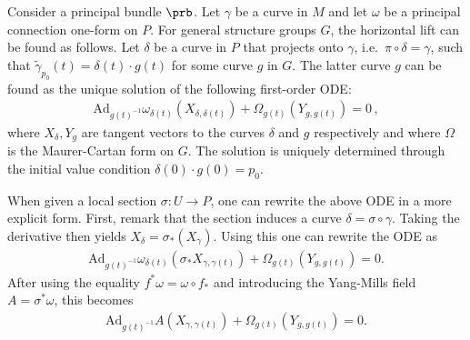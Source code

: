     \begin{method}
        Consider a principal bundle $\prb$. Let $\gamma$ be a curve in $M$ and let $\omega$ be a principal connection one-form on $P$. For general structure groups $G$, the horizontal lift can be found as follows. Let $\delta$ be a curve in $P$ that projects onto $\gamma$, i.e.~$\pi\circ\delta=\gamma$, such that $\widetilde\gamma_{p_0}(t)=\delta(t)\cdot g(t)$ for some curve $g$ in $G$. The latter curve $g$ can be found as the unique solution of the following first-order ODE:
        \begin{gather}
            \label{bundle:horizontal_ode}
            \mathrm{Ad}_{g(t)^{-1}}\omega_{\delta(t)}(X_{\delta,\delta(t)}) + \Omega_{g(t)}(Y_{g,g(t)}) = 0\,,
        \end{gather}
        where $X_\delta,Y_g$ are tangent vectors to the curves $\delta$ and $g$ respectively and where $\Omega$ is the Maurer-Cartan form on $G$. The solution is uniquely determined through the initial value condition $\delta(0)\cdot g(0) = p_0$.
    \end{method}
    \begin{remark}
        When given a local section $\sigma:U\rightarrow P$, one can rewrite the above ODE in a more explicit form. First, remark that the section induces a curve $\delta = \sigma\circ\gamma$. Taking the derivative then yields $X_\delta = \sigma_*(X_\gamma)$. Using this one can rewrite the ODE as
        \begin{gather}
            \mathrm{Ad}_{g(t)^{-1}}\omega_{\delta(t)}(\sigma_*X_{\gamma,\gamma(t)}) + \Omega_{g(t)}(Y_{g,g(t)}) = 0.
        \end{gather}
        After using the equality $f^*\omega = \omega\circ f_*$ and introducing the Yang-Mills field $A = \sigma^*\omega$, this becomes
        \begin{gather}
            \mathrm{Ad}_{g(t)^{-1}}A(X_{\gamma,\gamma(t)}) + \Omega_{g(t)}(Y_{g,g(t)}) = 0.
        \end{gather}
    \end{remark}

